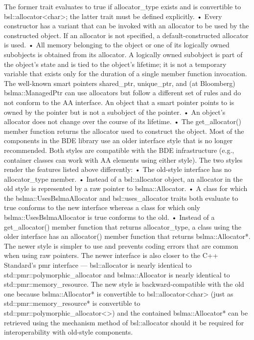 The former trait evaluates to true if allocator_type exists and is convertible to bsl::allocator<char>; the latter trait must be defined explicitly. 
•	Every constructor has a variant that can be invoked with an allocator to be used by the constructed object.  If an allocator is not specified, a default-constructed allocator is used.
•	All memory belonging to the object or one of its logically owned subobjects is obtained from its allocator. A logically owned subobject is part of the object’s state and is tied to the object’s lifetime; it is not a temporary variable that exists only for the duration of a single member function invocation.  The well-known smart pointers shared_ptr, unique_ptr, and (at Bloomberg) bslma::ManagedPtr can use allocators but follow a different set of rules and do not conform to the AA interface. An object that a smart pointer points to is owned by the pointer but is not a subobject of the pointer.
•	An object’s allocator does not change over the course of its lifetime.
•	The get_allocator() member function returns the allocator used to construct the object.
Most of the components in the BDE library use an older interface style that is no longer recommended. Both styles are compatible with the BDE infrastructure (e.g., container classes can work with AA elements using either style). The two styles render the features listed above differently: 
•	The old-style interface has no allocator_type member.
•	Instead of a bsl::allocator object, an allocator in the old style is represented by a raw pointer to bslma::Allocator.
•	A class for which the bslma::UsesBslmaAllocator and bsl::uses_allocator traits both evaluate to true conforms to the new interface whereas a class for which only bslma::UsesBslmaAllocator is true conforms to the old.
•	Instead of a get_allocator() member function that returns allocator_type, a class using the older interface has an allocator() member function that returns bslma::Allocator*.
The newer style is simpler to use and prevents coding errors that are common when using raw pointers.  The newer interface is also closer to the C++ Standard’s pmr  interface — bsl::allocator is nearly identical to std::pmr::polymorphic_allocator and bslma::Allocator is nearly identical to std::pmr::memory_resource.   The new style is backward-compatible with the old one because bslma::Allocator* is convertible to bsl::allocator<char> (just as std::pmr::memory_resource* is convertible to std::pmr::polymorphic_allocator<>) and the contained bslma::Allocator* can be retrieved using the mechanism method of bsl::allocator should it be required for interoperability with old-style components.
